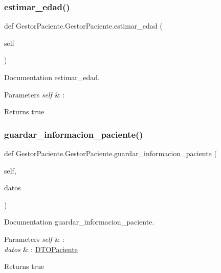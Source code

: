 \subsubsection{\texorpdfstring{estimar\+\_\+edad()}{estimar\_edad()}}
{\footnotesize\ttfamily def Gestor\+Paciente.\+Gestor\+Paciente.\+estimar\+\_\+edad (\begin{DoxyParamCaption}\item[{}]{self }\end{DoxyParamCaption})}



Documentation estimar\+\_\+edad. 


\begin{DoxyParams}{Parameters}
{\em self} & \+: \\
\hline
\end{DoxyParams}
\begin{DoxyReturn}{Returns}
true 
\end{DoxyReturn}
\mbox{\label{class_gestor_paciente_1_1_gestor_paciente_aa67ac548d627bedc213c3eb39b051bb9}} 
\subsubsection{\texorpdfstring{guardar\+\_\+informacion\+\_\+paciente()}{guardar\_informacion\_paciente()}}
{\footnotesize\ttfamily def Gestor\+Paciente.\+Gestor\+Paciente.\+guardar\+\_\+informacion\+\_\+paciente (\begin{DoxyParamCaption}\item[{}]{self,  }\item[{}]{datos }\end{DoxyParamCaption})}



Documentation guardar\+\_\+informacion\+\_\+paciente. 


\begin{DoxyParams}{Parameters}
{\em self} & \+: \\
\hline
{\em datos} & \+: \mbox{\hyperlink{namespace_d_t_o_paciente}{D\+T\+O\+Paciente}} \\
\hline
\end{DoxyParams}
\begin{DoxyReturn}{Returns}
true 
\end{DoxyReturn}



